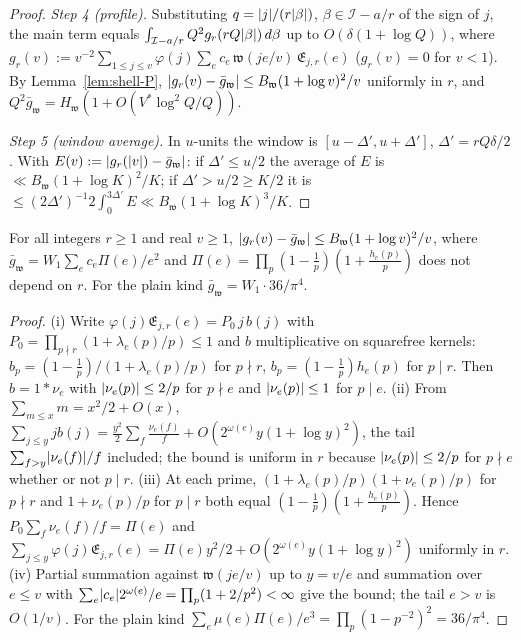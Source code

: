 \begin{proof}
\emph{Step 4 (profile).} Substituting $q=\lvert j\rvert/(r\lvert \beta\rvert)$, $\beta\in\mathcal I-a/r$ of the sign of $j$, the main term equals
$\int_{\mathcal I-a/r}Q^2g_r(rQ\lvert \beta\rvert)\,d\beta$ up to $O(\delta(1+\log Q))$, where
$g_r(v):=v^{-2}\sum_{1\le j\le v}\varphi(j)\sum_ec_e\,\mathfrak w(je/v)\,\mathfrak E_{j,r}(e)$ ($g_r(v)=0$ for $v<1$). By Lemma~\ref{lem:shell-P},
$\lvert g_r(v)-\bar g_{\mathfrak w}\rvert\le B_{\mathfrak w}(1+\log v)^2/v$ uniformly in $r$, and $Q^2\bar g_{\mathfrak w}=H_{\mathfrak w}(1+O(V^*\log^2Q/Q))$.

\emph{Step 5 (window average).} In $u$-units the window is $[u-\Delta',u+\Delta']$, $\Delta'=rQ\delta/2$. With $E(v):=\lvert g_r(\lvert v\rvert)-\bar g_{\mathfrak w}\rvert$: if
$\Delta'\le u/2$ the average of $E$ is $\ll B_{\mathfrak w}(1+\log K)^2/K$; if $\Delta'>u/2\ge K/2$ it is $\le(2\Delta')^{-1}2\int_0^{3\Delta'}E\ll B_{\mathfrak w}(1+\log K)^3/K$.
\end{proof}

\begin{lemma}\label{lem:shell-P}
For all integers $r\ge1$ and real $v\ge1$, $\lvert g_r(v)-\bar g_{\mathfrak w}\rvert\le B_{\mathfrak w}(1+\log v)^2/v$, where $\bar g_{\mathfrak w}=W_1\sum_ec_e\Pi(e)/e^2$ and
$\Pi(e)=\prod_p(1-\frac1p)(1+\frac{h_e(p)}p)$ does not depend on $r$. For the plain kind $\bar g_{\mathfrak w}=W_1\cdot36/\pi^4$.
\end{lemma}
\begin{proof}
(i) Write $\varphi(j)\mathfrak E_{j,r}(e)=P_0\,j\,b(j)$ with $P_0=\prod_{p\nmid r}(1+\lambda_e(p)/p)\le1$ and $b$ multiplicative on squarefree kernels:
$b_p=(1-\frac1p)/(1+\lambda_e(p)/p)$ for $p\nmid r$, $b_p=(1-\frac1p)h_e(p)$ for $p\mid r$. Then $b=1*\nu_e$ with $\lvert \nu_e(p)\rvert\le2/p$ for $p\nmid e$ and
$\lvert \nu_e(p)\rvert\le1$ for $p\mid e$.
(ii) From $\sum_{m\le x}m=x^2/2+O(x)$, $\sum_{j\le y}jb(j)=\frac{y^2}2\sum_f\frac{\nu_e(f)}f+O(2^{\omega(e)}y(1+\log y)^2)$, the tail $\sum_{f>y}\lvert \nu_e(f)\rvert/f$
included; the bound is uniform in $r$ because $\lvert \nu_e(p)\rvert\le2/p$ for $p\nmid e$ whether or not $p\mid r$.
(iii) At each prime, $(1+\lambda_e(p)/p)(1+\nu_e(p)/p)$ for $p\nmid r$ and $1+\nu_e(p)/p$ for $p\mid r$ both equal $(1-\frac1p)(1+\frac{h_e(p)}p)$. Hence
$P_0\sum_f\nu_e(f)/f=\Pi(e)$ and $\sum_{j\le y}\varphi(j)\mathfrak E_{j,r}(e)=\Pi(e)y^2/2+O(2^{\omega(e)}y(1+\log y)^2)$ uniformly in $r$.
(iv) Partial summation against $\mathfrak w(je/v)$ up to $y=v/e$ and summation over $e\le v$ with $\sum_e\lvert c_e\rvert2^{\omega(e)}/e=\prod_p(1+2/p^2)<\infty$ give
the bound; the tail $e>v$ is $O(1/v)$. For the plain kind $\sum_e\mu(e)\Pi(e)/e^3=\prod_p(1-p^{-2})^2=36/\pi^4$.
\end{proof}

